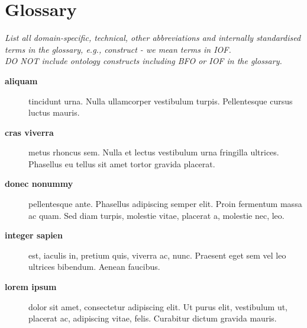 \chapter*{Glossary}

\emph{List all domain-specific, technical, other abbreviations and internally standardised terms in the glossary, e.g., construct - we mean terms in IOF. \\ 
DO NOT include ontology constructs including BFO or IOF in the glossary.}

\noindent
{} %
\begin{description}
    \item[\textbf{aliquam}] 
    \hspace{3mm} tincidunt urna. Nulla ullamcorper vestibulum turpis. Pellentesque cursus luctus mauris.
    
    \item[\textbf{cras viverra}]
    \hspace{3em} metus rhoncus sem. Nulla et lectus vestibulum urna fringilla ultrices. Phasellus eu tellus sit amet tortor gravida placerat.
    
    \item[\textbf{donec nonummy}]
    \hspace{3em} pellentesque ante. Phasellus adipiscing semper elit. Proin fermentum massa ac quam. Sed diam turpis, molestie vitae, placerat a, molestie nec, leo.
    
    \item[\textbf{integer sapien}]
    \hspace{3em} est, iaculis in, pretium quis, viverra ac, nunc. Praesent eget sem vel leo ultrices bibendum. Aenean faucibus.
    
    \item[\textbf{lorem ipsum}]
    \hspace{3em} dolor sit amet, consectetur adipiscing elit. Ut purus elit, vestibulum ut, placerat ac, adipiscing vitae, felis. Curabitur dictum gravida mauris.
\end{description}


